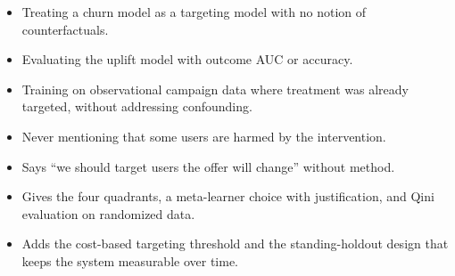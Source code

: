 \begin{interviewq}
\redflags
\begin{itemize}
    \item Treating a churn model as a targeting model with no notion of counterfactuals.
    \item Evaluating the uplift model with outcome AUC or accuracy.
    \item Training on observational campaign data where treatment was already targeted, without addressing confounding.
    \item Never mentioning that some users are harmed by the intervention.
\end{itemize}


\goodgreat
\begin{itemize}
    \item {} Says ``we should target users the offer will change'' without method.
    \item {} Gives the four quadrants, a meta-learner choice with justification, and Qini evaluation on randomized data.
    \item {} Adds the cost-based targeting threshold and the standing-holdout design that keeps the system measurable over time.
\end{itemize}

\end{interviewq}

